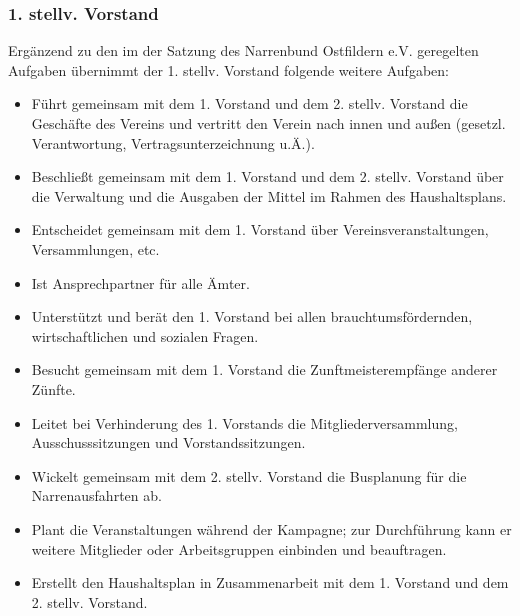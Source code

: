\subsubsection{1. stellv. Vorstand}
Ergänzend zu den im  der Satzung des Narrenbund Ostfildern e.V. geregelten Aufgaben übernimmt der 1. stellv. Vorstand folgende weitere Aufgaben:
\begin{itemize}
    \item Führt gemeinsam mit dem 1. Vorstand und dem 2. stellv. Vorstand die Geschäfte des Vereins und vertritt den Verein nach innen und außen (gesetzl. Verantwortung, Vertragsunterzeichnung u.Ä.).

    \item Beschließt gemeinsam mit dem 1. Vorstand und dem 2. stellv. Vorstand über die Verwaltung und die Ausgaben der Mittel im Rahmen des Haushaltsplans.

    \item Entscheidet gemeinsam mit dem 1. Vorstand über Vereinsveranstaltungen, Versammlungen, etc.

    \item Ist Ansprechpartner für alle Ämter.

    \item Unterstützt und berät den 1. Vorstand bei allen brauchtumsfördernden, wirtschaftlichen und sozialen Fragen.

    \item Besucht gemeinsam mit dem 1. Vorstand die Zunftmeisterempfänge anderer Zünfte.

    \item Leitet bei Verhinderung des 1. Vorstands die Mitgliederversammlung, Ausschusssitzungen und Vorstandssitzungen.

    \item Wickelt gemeinsam mit dem 2. stellv. Vorstand die Busplanung für die Narrenausfahrten ab.

    \item Plant die Veranstaltungen während der Kampagne; zur Durchführung kann er weitere Mitglieder oder Arbeitsgruppen einbinden und beauftragen.

    \item Erstellt den Haushaltsplan in Zusammenarbeit mit dem 1. Vorstand und dem 2. stellv. Vorstand.
\end{itemize}

